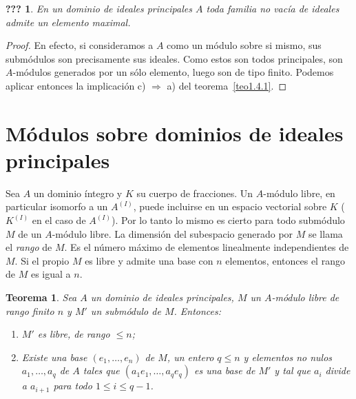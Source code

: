 \documentclass[10pt,oneside,bibtotoc,smallheadings,leqno,a5paper,DIV=12]{scrbook}
\newcommand{\then}{\ensuremath{\Rightarrow}\xspace}
\numberwithin{equation}{section}
\theoremstyle{defi}
\theoremstyle{enonce}
\newtheorem{theorem}{Teorema}
\newcommand{\namedname}{???}
\newtheorem*{namedthm}{\namedname}
\newenvironment{named}[1]%
	{\renewcommand{\namedname}{#1}%
	\begin{namedthm}}%
	{\end{namedthm}}
\theoremstyle{rem}
\numberwithin{theorem}{section}
\numberwithin{proposition}{section}
\numberwithin{definition}{section}
\numberwithin{lemma}{section}
\numberwithin{corollary}{section}
\numberwithin{example}{section}
\numberwithin{footnote}{section}%
\begin{document}
\begin{named}{Corolario del teorema 1}
En un dominio de ideales principales $A$ toda familia no vac\'ia
de ideales admite un elemento maximal.
\end{named}

\begin{proof}
En efecto, si consideramos a $A$ como un m\'odulo sobre si
mismo, sus subm\'odulos son precisamente sus ideales. Como estos
son todos principales, son $A$-m\'odulos generados por un
s\'olo elemento, luego son de tipo finito. Podemos aplicar
entonces la implicaci\'on c) \then a) del teorema~\ref{teo1.4.1}.
\end{proof}

\section{M\'odulos sobre dominios de ideales principales}\label{sec1.5}

Sea $A$ un dominio \'integro y $K$ su cuerpo de fracciones. Un $A$-m\'odulo
libre, en particular isomorfo a un $A^{(I)}$, puede incluirse en
un espacio vectorial sobre $K$ ($K^{(I)}$ en el caso de $A^{(I)}$).
Por lo tanto lo mismo es cierto para todo subm\'odulo $M$ de un
$A$-m\'odulo libre. La dimensi\'on del subespacio generado por
$M$ se llama el {\em rango} de $M$. Es el n\'umero m\'aximo de
elementos linealmente independientes de $M$. Si el propio $M$ es libre
y admite una base con $n$ elementos, entonces el rango de $M$ es
igual a $n$.

\begin{theorem}\label{teo1.5.1}
Sea $A$ un dominio de ideales principales, $M$ un $A$-m\'odulo
libre de rango finito $n$ y $M'$ un subm\'odulo de $M$. Entonces:
\begin{enumerate}
\item $M'$ es libre, de rango $\leq n$;
\item Existe una base $(e_{1},\dots,e_{n})$ de $M$, un entero
$q\leq n$ y elementos no nulos $a_{1},\dots,a_{q}$ de $A$ tales que
$(a_{1}e_{1},\dots, a_{q}e_{q})$ es una base de $M'$ y tal que
$a_{i}$ divide a $a_{i+1}$ para todo $1\leq i\leq q-1$.
\end{enumerate}
\end{theorem}
\end{document}
